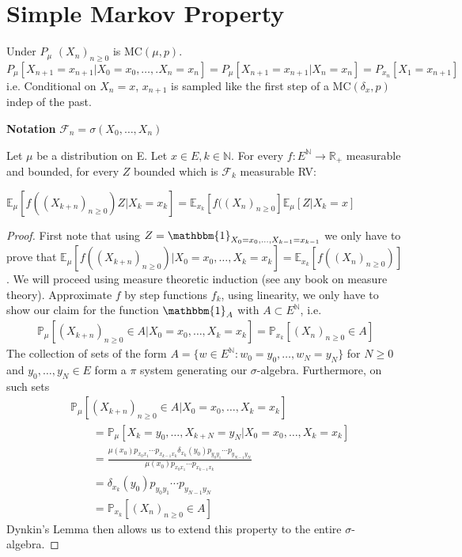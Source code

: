 \section{Simple Markov Property}
Under $P_\mu$ $(X_n)_{n \geq 0}$ is $ \textrm{MC}(\mu, p)$.
$P_\mu [X_{n+1}=x_{n+1} | X_0 = x_0, \ldots ,.X_n=x_n] = P_\mu[X_{n+1}=x_{n+1}| X_n = x_n] = P_{x_n}[X_1 =x_{n+1}]$ i.e. Conditional on $X_n=x$, $x_{n+1}$ is sampled like the first step of a $ \textrm{MC}(\delta_{x},p)$ indep of the past.

\textbf{Notation} $ \mathcal{F}_n = \sigma(X_0, \ldots ,X_n)$ 

\begin{theorem}
	Let $\mu$ be a distribution on E. Let $x \in E, k \in \mathbb{N}$. For every $f: E^{\mathbb{N}} \to \mathbb{R}_+$ measurable and bounded, for every $Z$ bounded which is $ \mathcal{F}_k$ measurable RV:

	$\mathbb{E}_\mu \left[ f((X_{k+n})_{n \geq 0})Z | X_k = x_k \right] = \mathbb{E}_{x_k} \left[ f((X_n)_{n \geq 0} \right] \mathbb{E}_\mu \left[ Z | X_k=x \right] $
\end{theorem}
\begin{proof}
	First note that using $Z= \mathbbm{1}_{X_0=x_0, \ldots ,X_{k-1}=x_{k-1}}$ we only have to prove that \newline $\mathbb{E}_{\mu } \left[ f((X_{k+n})_{n\geq 0}) | X_0=x_0 , \ldots , X_k=x_k \right]= \mathbb{E}_{x_k} \left[ f((X_n)_{n\geq 0}) \right]$. We will proceed using measure theoretic induction (see any book on measure theory). Approximate $f$ by step functions $f_k$, using linearity, we only have to show our claim for the function $\mathbbm{1}_{A} $ with $A \subset E ^{\mathbb{N}}$, i.e. 
	\begin{align}
	\mathbb{P}_{\mu } \left[ (X_{k+n})_{n\geq 0}\in A | X_0=x_0, \ldots ,X_k=x_k \right] = \mathbb{P}_{x_k} \left[ (X_n)_{n\geq 0} \in A \right] 
\end{align}  
The collection of sets of the form $A=\{w \in E^{\mathbb{N}}: w_0=y_0, \ldots ,w_N=y_N\}$ for $N\geq 0$ and $y_0, \ldots ,y_N \in E$ form a $\pi $ system generating our $\sigma$-algebra. Furthermore, on such sets 
\begin{align}
&	\mathbb{P}_{\mu } \left[ (X_{k+n})_{n\geq 0}\in A | X_0 = x_0, \ldots ,X_k=x_k \right] \\
&\qquad= \mathbb{P}_{\mu} \left[ X_k=y_0, \ldots ,X_{k+N}= y_N | X_0=x_0, \ldots ,X_k=x_k  \right] \\
&\qquad= \frac{\mu (x_0) p_{x_0x_1} \cdots p_{x_{k-1}x_k} \delta_{x_k}(y_0)p_{y_0y_1} \cdots p_{y_{N-1}y_N}}{\mu (x_0) p_{x_0x_1} \cdots p_{x_{k-1}x_k} } \\
& \qquad= \delta_{x_k}(y_0)p_{y_0y_1} \cdots p_{y_{N-1}y_N} \\
& \qquad= \mathbb{P}_{x_k} \left[ (X_n)_{n\geq 0} \in A \right] 
\end{align}
Dynkin's Lemma then allows us to extend this property to the entire $\sigma$-algebra.
\end{proof}


